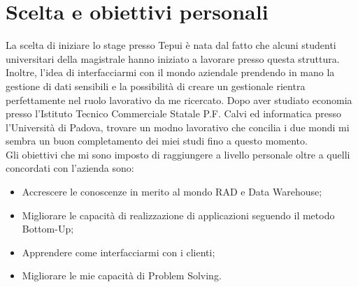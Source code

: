 \section{Scelta e obiettivi personali}
La scelta di iniziare lo stage presso Tepui è nata dal fatto che alcuni studenti universitari della magistrale hanno iniziato a lavorare presso questa struttura. Inoltre, l'idea di interfacciarmi con il mondo aziendale prendendo in mano la gestione di dati sensibili e la possibilità di creare un gestionale rientra perfettamente nel ruolo lavorativo da me ricercato. Dopo aver studiato economia presso l'Istituto Tecnico Commerciale Statale P.F. Calvi ed informatica presso l'Università di Padova, trovare un modno lavorativo che concilia i due mondi mi sembra un buon completamento dei miei studi fino a questo momento.\\

Gli obiettivi che mi sono imposto di raggiungere a livello personale oltre a quelli concordati con l'azienda sono: 
\begin{itemize}
	\item Accrescere le conoscenze in merito al mondo RAD e Data Warehouse;
	\item Migliorare le capacità di realizzazione di applicazioni seguendo il metodo Bottom-Up;
	\item Apprendere come interfacciarmi con i clienti;
	\item Migliorare le mie capacità di Problem Solving.
\end{itemize}

